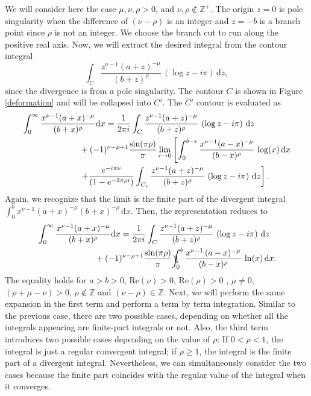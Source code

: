 We will consider here the case $\mu, \nu, \rho > 0$, and $\nu,\rho \not \in \mathbb{Z}^{+}$. The origin $z=0$ is pole singularity when the difference of $(\nu-\rho)$ is an integer and $z=-b$ is a branch point since $\rho$ is not an integer. We choose the branch cut to run along the positive real axis. Now, we will extract the desired integral from the contour integral 
\begin{equation}
\int_C \frac{z^{\nu-1} (a+z)^{-\mu}}{(b+z)^{\rho}}\,\left(\log z - i\pi\right)\, \mathrm{d}z,
\end{equation}
since the divergence is from a pole singularity. The contour $C$ is shown in Figure \ref{deformation} and will be collapsed into $C'$. The $C'$ contour is evaluated as  
\begin{equation}
\begin{split}
&\int_0^{\infty} \frac{x^{\nu-1} (a+x)^{-\mu}}{(b+x)^{\rho}} \mathrm{d}x=  \frac{1}{2\pi i} \int_C \frac{z^{\nu-1} (a+z)^{-\mu}}{(b+z)^{\rho}}\,\left(\log z - i\pi\right)\, \mathrm{d}z \\
& \hspace{24mm}+ (-1)^{\nu-\rho+1} \frac{\sin(\pi \rho)}{\pi} \lim_{\epsilon\rightarrow 0} \left[\int_0^{b-\epsilon} \frac{x^{\nu-1} (a-x)^{-\mu}}{(b-x)^{\rho}}\,\log(x)\,\mathrm{d}x \right. \\
& \hspace{24mm}\left.  + \frac{e^{-i\pi\nu}}{(1-e^{-2\pi\rho i})}\int_{C_{\epsilon}} \frac{z^{\nu-1} (a+z)^{-\mu}}{(b+z)^{\rho}}\,\left(\log z - i\pi\right)\, \mathrm{d}z\right].
\end{split}
\end{equation}
Again, we recognize that the limit is the finite part of the divergent integral $\int_0^b x^{\nu-1} (a+x)^{-\mu} (b+x)^{-\rho}\,\mathrm{d}x$. Then, the representation reduces to 
\begin{equation}
\begin{split} \label{repcase4b}
&\int_0^{\infty} \frac{x^{\nu-1} (a+x)^{-\mu}}{(b+x)^{\rho}}\mathrm{d}x =  \frac{1}{2\pi i} \int_C \frac{z^{\nu-1} (a+z)^{-\mu}}{(b+z)^{\rho}}\,\left(\log z - i\pi\right)\, \mathrm{d}z \\
& \hspace{24mm}+  (-1)^{\nu-\rho+1}\frac{\sin(\pi\rho)}{\pi} \bbint{0}{b} \frac{x^{\nu-1} \, (a-x)^{-\mu}}{(b-x)^{\rho}} \, \ln(x)\, \mathrm{d}x.
\end{split}
\end{equation}
The equality holds for $a>b>0$, $\mathrm{Re}(\nu) > 0$, $\mathrm{Re}(\rho) > 0$ , $\mu \not = 0$, $(\rho+\mu-\nu)>0$, $\rho \not \in \mathbb{Z}$ and $(\nu-\rho)\in \mathbb{Z}$. Next, we will perform the same expansion in the first term and perform a term by term integration. Similar to the previous case, there are two possible cases, depending on whether all the integrals appearing are finite-part integrals or not. Also, the third term introduces two possible cases depending on the value of $\rho$: If $0<\rho<1$, the integral is just a regular convergent integral; if $\rho\geq 1$, the integral is the finite part of a divergent integral. Nevertheless, we can simultaneously consider the two cases because the finite part coincides with the regular value of the integral when it converges. 


